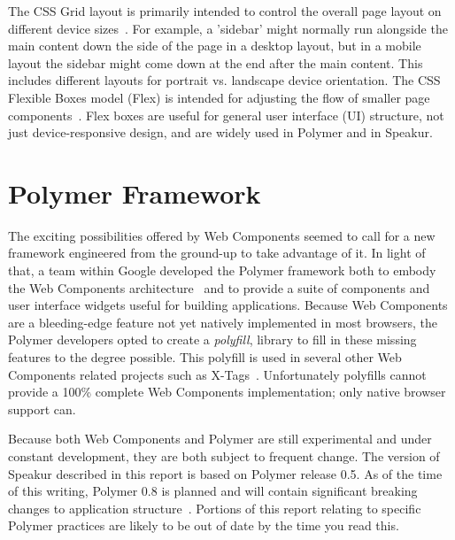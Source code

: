 The CSS Grid layout is primarily intended to control the overall page layout on different device sizes~\cite{w3ccontributors2015-d}.
For example, a 'sidebar' might normally run alongside the main content down the side of the page in a desktop layout, but in a mobile layout the sidebar might come down at the end after the main content.
This includes different layouts for portrait vs. landscape device orientation.
The CSS Flexible Boxes model (Flex) is intended for adjusting the flow of smaller page components~\cite{mozillacontributors2015}.
Flex boxes are useful for general user interface (UI) structure, not just device-responsive design, and are widely used in Polymer and in Speakur.

\section{Polymer Framework}

The exciting possibilities offered by Web Components seemed to call for a new framework engineered from the ground-up to take advantage of it.
In light of that, a team within Google developed the 
Polymer framework both to embody the Web Components 
architecture~\cite{polymercontributors2015} and 
to provide a suite of components and user interface widgets useful for building applications.
Because Web Components are a bleeding-edge feature not yet natively implemented in most browsers,
the Polymer developers opted to create a \textit{polyfill}, 
library to fill in these missing features to the degree possible.
This polyfill is used in several other Web Components related projects such as 
X-Tags~\cite{x-tagscontributors2015}.
Unfortunately polyfills cannot provide a 100\% complete Web Components implementation; 
only native browser support can.

Because both Web Components and Polymer are still experimental and under constant development, 
they are both subject to frequent change.
The version of Speakur described in this report is based on Polymer release 0.5.
As of the time of this writing, Polymer 0.8 is planned and will contain significant breaking changes to application structure~\cite{michaelbleigh2015}.
Portions of this report relating to specific Polymer practices are likely to be out of date by the time you read this.

